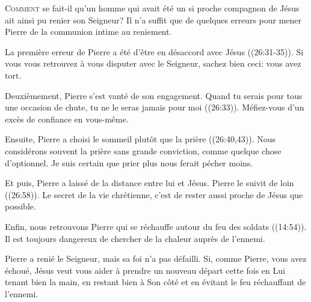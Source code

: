 
\lettrine{C}{omment} se fait-il qu'un homme qui avait été un si proche
 compagnon de Jésus ait ainsi pu renier son Seigneur?
 Il n'a suffit que de quelques erreurs pour mener Pierre de la communion intime au reniement. 

La première erreur de Pierre a été d'être en désaccord avec Jésus
 ((26:31-35)).
 Si vous vous retrouvez à vous disputer avec le Seigneur,
 sachez bien ceci: vous avez tort. 


Deuxièmement, Pierre s'est vanté de son engagement.
 \Og Quand tu serais pour tous une occasion de chute,
 tu ne le seras jamais pour moi \Fg{} ((26:33)).
 Méfiez-vous d'un excès de confiance en vous-même. 

Ensuite, Pierre a choisi le sommeil plutôt que la prière
 ((26:40,43)).
 Nous considérons souvent la prière sans grande conviction,
 comme quelque chose d'optionnel.
 Je suis certain que prier plus nous ferait pécher moins. 

Et puis, Pierre a laissé de la distance entre lui et Jésus.
 \Og Pierre le suivit de loin \Fg{} ((26:58)).
 Le secret de la vie chrétienne, 
 c'est de rester aussi proche de Jésus que possible. 

Enfin, nous retrouvons Pierre qui se réchauffe
 autour du feu des soldats ((14:54)).
 Il est toujours dangereux de chercher de la chaleur auprès de l'ennemi. 

Pierre a renié le Seigneur, mais sa foi n'a pas défailli.
 Si, comme Pierre, vous avez échoué, Jésus veut vous aider
 à prendre un nouveau départ \ocadr cette fois en Lui tenant bien la main,
 en restant bien à Son côté et en évitant le feu réchauffant de l'ennemi. 

\dvrule



